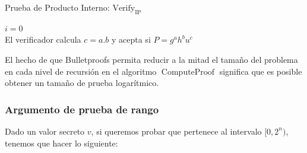 \begin{minipage}{0.9\textwidth}
    \begin{algorithm}[H]
        \caption{Prueba de Producto Interno: $\operatorname{Verify_{IP}}$}
        $i = 0$ \\
        El verificador calcula $c = a.b$ y acepta si $P = g^{a}h^{b}u^{c}$
    \end{algorithm}
\end{minipage}

El hecho de que Bulletproofs permita reducir a la mitad el tamaño del problema en cada nivel de recursión en el algoritmo $\operatorname{ComputeProof}$ significa que es posible obtener un tamaño de prueba logarítmico.

\subsubsection{Argumento de prueba de rango}

Dado un valor secreto $v$, si queremos probar que pertenece al intervalo $[0, 2^{n})$, tenemos que hacer lo siguiente:

